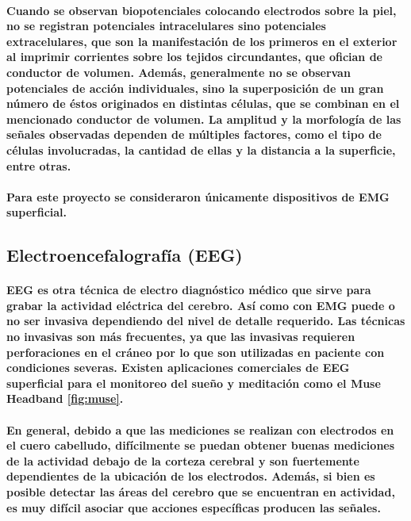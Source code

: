 \documentclass{article}
\begin{document}
\paragraph{
Cuando se observan biopotenciales colocando electrodos sobre la piel, no se registran potenciales intracelulares sino potenciales extracelulares, que son la manifestación de los primeros en el exterior al imprimir
corrientes sobre los tejidos circundantes, que ofician de conductor de volumen. Además, generalmente no se observan potenciales de acción individuales, sino la superposición de un gran número de éstos originados en distintas células, que se combinan en el mencionado conductor de volumen. La amplitud y la morfología de las señales observadas dependen de múltiples factores, como el tipo de células involucradas, la cantidad de ellas y la distancia a la superficie, entre otras. \cite{haberman2016}
}
\paragraph{
Para este proyecto se consideraron únicamente dispositivos de EMG superficial.
}

\subsection{Electroencefalografía (EEG)}
\paragraph{
EEG es otra técnica de electro diagnóstico médico que sirve para grabar la actividad eléctrica del cerebro. Así como con EMG puede o no ser invasiva dependiendo del nivel de detalle requerido. Las técnicas no invasivas son más frecuentes, ya que las invasivas requieren perforaciones en el cráneo por lo que son utilizadas en paciente con condiciones severas. Existen aplicaciones comerciales de EEG superficial para el monitoreo del sueño y meditación como el Muse Headband \ref{fig:muse}.
}
\paragraph{
En general, debido a que las mediciones se realizan con electrodos en el cuero cabelludo, difícilmente se puedan obtener buenas mediciones de la actividad debajo de la corteza cerebral y son fuertemente dependientes de la ubicación de los electrodos. Además, si bien es posible detectar las áreas del cerebro que se encuentran en actividad, es muy difícil asociar que acciones específicas producen las señales.
}
\end{document}

